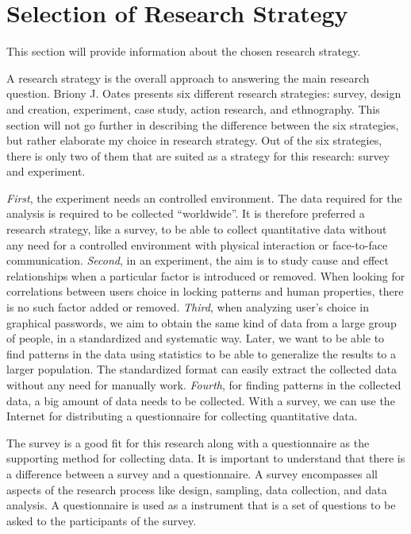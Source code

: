 \section{Selection of Research Strategy} \label{sec:researchstrategy}

  This section will provide information about the chosen research strategy.

  A research strategy is the overall approach to answering the main research question. Briony J. Oates \cite{empiriske} presents six different research strategies: survey, design and creation, experiment, case study, action research, and ethnography. This section will not go further in describing the difference between the six strategies, but rather elaborate my choice in research strategy. Out of the six strategies, there is only two of them that are suited as a strategy for this research: survey and experiment. 

  {\it First}, the experiment needs an controlled environment. The data required for the analysis is required to be collected ``worldwide''. It is therefore preferred a research strategy, like a survey, to be able to collect quantitative data without any need for a controlled environment with physical interaction or face-to-face communication.
  {\it Second}, in an experiment, the aim is to study cause and effect relationships when a particular factor is introduced or removed. When looking for correlations between users choice in locking patterns and human properties, there is no such factor added or removed.
  {\it Third}, when analyzing user's choice in graphical passwords, we aim to obtain the same kind of data from a large group of people, in a standardized and systematic way. Later, we want to be able to find patterns in the data using statistics to be able to generalize the results to a larger population. The standardized format can easily extract the collected data without any need for manually work.
  {\it Fourth}, for finding patterns in the collected data, a big amount of data needs to be collected. With a survey, we can use the Internet for distributing a questionnaire for collecting quantitative data. 

  The survey is a good fit for this research along with a questionnaire as the supporting method for collecting data. It is important to understand that there is a difference between a survey and a questionnaire. A survey encompasses all aspects of the research process like design, sampling, data collection, and data analysis. A questionnaire is used as a instrument that is a set of questions to be asked to the participants of the survey.
  

